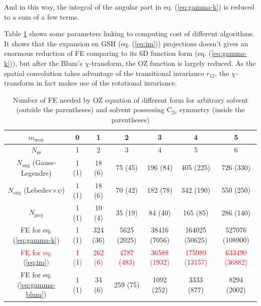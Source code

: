 And in this way, the integral of the angular part in eq. (\ref{eq:gamma-k})
is reduced to a sum of a few terms.

Table \ref{tab:FE-of-OZ} shows some parameters linking to computing
cost of different algorithms. It shows that the expansion en GSH (eq.
(\ref{eq:im})) projections doesn't gives an enormous reduction of
FE comparing to its 6D function form (eq. (\ref{eq:gamma-k})), but
after the Blum's $\chi$-transform, the OZ function is largely reduced.
As the spatial convolution takes advantage of the transitional invariance
$r_{12}$, the $\chi$-transform in fact makes use of the rotational
invariance.

\begin{table}[h]
\begin{centering}
\begin{tabular*}{1\textwidth}{@{\extracolsep{\fill}}ccccccc}
\toprule 
{\footnotesize{}$m_{\mathrm{max}}$} & {\footnotesize{}0} & {\footnotesize{}1} & {\footnotesize{}2} & {\footnotesize{}3} & {\footnotesize{}4} & {\footnotesize{}5}\tabularnewline
\midrule
{\footnotesize{}$N_{\Theta}$} & {\footnotesize{}1} & {\footnotesize{}2} & {\footnotesize{}3} & {\footnotesize{}4} & {\footnotesize{}5} & {\footnotesize{}6}\tabularnewline
{\footnotesize{}$N_{\mathrm{ang}}$ (Gauss-Legendre)} & {\footnotesize{}1 (1)} & {\footnotesize{}18 (6)} & {\footnotesize{}75 (45)} & {\footnotesize{}196 (84)} & {\footnotesize{}405 (225)} & {\footnotesize{}726 (330)}\tabularnewline
{\footnotesize{}$N_{\mathrm{ang}}$ (Lebedev$\times\psi$)} & {\footnotesize{}1 (1)} & {\footnotesize{}18 (6)} & {\footnotesize{}70 (42)} & {\footnotesize{}182 (78)} & {\footnotesize{}342 (190)} & {\footnotesize{}550 (250)}\tabularnewline
{\footnotesize{}$N_{\mathrm{proj}}$ } & {\footnotesize{}1 (1)} & {\footnotesize{}10 (4)} & {\footnotesize{}35 (19)} & {\footnotesize{}84 (40)} & {\footnotesize{}165 (85)} & {\footnotesize{}286 (140)}\tabularnewline
{\footnotesize{}FE for eq. (\ref{eq:gamma-k})} & {\footnotesize{}1 (1)} & {\footnotesize{}324 (36)} & {\footnotesize{}5625 (2025)} & {\footnotesize{}38416 (7056)} & {\footnotesize{}164025 (50625)} & {\footnotesize{}527076 (108900)}\tabularnewline
\textcolor{red}{\footnotesize{}FE for eq. (\ref{eq:im})} & \textcolor{red}{\footnotesize{}1 (1)} & \textcolor{red}{\footnotesize{}262 (6)} & \textcolor{red}{\footnotesize{}4787 (483)} & \textcolor{red}{\footnotesize{}36588 (1932)} & \textcolor{red}{\footnotesize{}175989 (13157)} & \textcolor{red}{\footnotesize{}633490 (36882)}\tabularnewline
{\footnotesize{}FE for eq. (\ref{eq:gamma-blum})} & {\footnotesize{}1 (1)} & {\footnotesize{}34 (6)} & {\footnotesize{}259 (75)} & {\footnotesize{}1092 (252)} & {\footnotesize{}3333 (877)} & {\footnotesize{}8294 (2002)}\tabularnewline
\bottomrule
\end{tabular*}
\par\end{centering}

\caption[Number of FE needed by OZ equation of different form]{Number of FE needed by OZ equation of different form for arbitrary
solvent (outside the parentheses) and solvent possessing $\mathrm{C}_{2v}$
symmetry (inside the parentheses)\label{tab:FE-of-OZ}}
\end{table}



